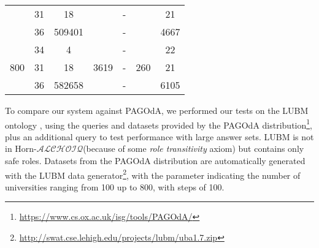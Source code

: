 \documentclass[runningheads]{llncs}
\newcommand{\alchoiq}{$\mathcal{ALCHOIQ}$\xspace}
\newcommand{\hornalchoiq}{Horn-\alchoiq\xspace}
\newcommand{\pagoda}{\mbox{PAGOdA}\xspace}
\begin{document}
\begin{table}[t]
\begin{tabular}{c | c | c | c | c | c | c}
                              \cline{2-3}                                                \cline{5-5}                         \cline{7-7}
                             & 31        & 18                  &                        & -         &                       & 21       \\
                              \cline{2-3}                                                \cline{5-5}                         \cline{7-7}
                             & 36        & 509401              &                        & -         &                       & 4667     \\
        \hline
        \multirow{3}{*}{800} & 34        & 4                   & \multirow{3}{*}{3619}  & -         & \multirow{3}{*}{260}  & 22       \\
                              \cline{2-3}                                                \cline{5-5}                         \cline{7-7}
                             & 31        & 18                  &                        & -         &                       & 21       \\
                              \cline{2-3}                                                \cline{5-5}                         \cline{7-7}
                             & 36        & 582658              &                        & -         &                       & 6105     \\
        \hline
    \end{tabular}
    \label{table:comparison_answering_time}
\end{table}

To compare our system against \pagoda, we performed our tests on the LUBM ontology \cite{guo2005}, using the queries and datasets provided by the \pagoda distribution\footnote{\url{https://www.cs.ox.ac.uk/isg/tools/PAGOdA/}}, plus an additional query to test performance with large answer sets.
LUBM is not in \hornalchoiq (because of some \emph{role transitivity} axiom) but contains only safe roles.
Datasets from the \pagoda distribution are automatically generated with the LUBM data generator\footnote{\url{http://swat.cse.lehigh.edu/projects/lubm/uba1.7.zip}}, with the parameter indicating the number of universities ranging from 100 up to 800, with steps of 100.
\end{document}
